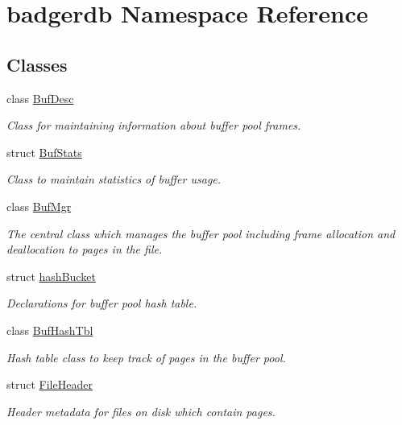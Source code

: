 \hypertarget{namespacebadgerdb}{\section{badgerdb Namespace Reference}
\label{namespacebadgerdb}
}
\subsection*{Classes}
\begin{DoxyCompactItemize}
\item 
class \hyperlink{classbadgerdb_1_1BufDesc}{Buf\-Desc}
\begin{DoxyCompactList}\small\item\em Class for maintaining information about buffer pool frames. \end{DoxyCompactList}\item 
struct \hyperlink{structbadgerdb_1_1BufStats}{Buf\-Stats}
\begin{DoxyCompactList}\small\item\em Class to maintain statistics of buffer usage. \end{DoxyCompactList}\item 
class \hyperlink{classbadgerdb_1_1BufMgr}{Buf\-Mgr}
\begin{DoxyCompactList}\small\item\em The central class which manages the buffer pool including frame allocation and deallocation to pages in the file. \end{DoxyCompactList}\item 
struct \hyperlink{structbadgerdb_1_1hashBucket}{hash\-Bucket}
\begin{DoxyCompactList}\small\item\em Declarations for buffer pool hash table. \end{DoxyCompactList}\item 
class \hyperlink{classbadgerdb_1_1BufHashTbl}{Buf\-Hash\-Tbl}
\begin{DoxyCompactList}\small\item\em Hash table class to keep track of pages in the buffer pool. \end{DoxyCompactList}\item 
struct \hyperlink{structbadgerdb_1_1FileHeader}{File\-Header}
\begin{DoxyCompactList}\small\item\em Header metadata for files on disk which contain pages. \end{DoxyCompactList}\item 

\end{DoxyCompactItemize}
